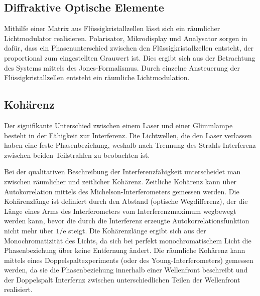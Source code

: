 \documentclass[
	a4paper,
	12pt,
	pagesize,
	ngerman
]{scrartcl}
\begin{document}
	\subsection{Diffraktive Optische Elemente} %

	Mithilfe einer Matrix aus Flüssigkristallzellen lässt sich ein räumlicher Lichtmodulator realisieren.
	Polarisator, Mikrodisplay und Analysator sorgen in dafür, dass ein Phasenunterschied zwischen den Flüssigkristallzellen entsteht, der proportional zum eingestellten Grauwert ist.
	Dies ergibt sich aus der Betrachtung des Systems mittels des Jones-Formalismus.
	Durch einzelne Ansteuerung der Flüssigkristallzellen entsteht ein räumliche Lichtmodulation.


	\subsection{Kohärenz}
	Der signifikante Unterschied zwischen einem Laser und einer Glimmlampe besteht in der Fähigkeit zur Interferenz.
	Die Lichtwellen, die den Laser verlassen haben eine feste Phasenbeziehung, weshalb nach Trennung des Strahls Interferenz zwischen beiden Teilstrahlen zu beobachten ist.

	Bei der qualitativen Beschreibung der Interferenzfähigkeit unterscheidet man zwischen räumlicher und zeitlicher Kohärenz.
	Zeitliche Kohärenz kann über Autokorrelation mittels des Michelson-Interferometers gemessen werden.
	Die Kohärenzlänge ist definiert durch den Abstand (optische Wegdifferenz), der die Länge eines Arms des Interferometers vom Interferenzmaximum wegbewegt werden kann, bevor die durch die Interferenz erzeugte Autokorrelationsfunktion nicht mehr über $1/\text{e}$ steigt.
	Die Kohärenzlänge ergibt sich aus der Monochromatizität des Lichts, da sich bei perfekt monochromatischem Licht die Phasenbeziehung über keine Entfernung ändert.
	Die räumliche Kohärenz kann mittels eines Doppelspaltexperiments (oder des Young-Interferometers) gemessen werden, da sie die Phasenbeziehung innerhalb einer Wellenfront beschreibt und der Doppelspalt Interfernz zwischen unterschiedlichen Teilen der Wellenfront realisiert.

\end{document}
